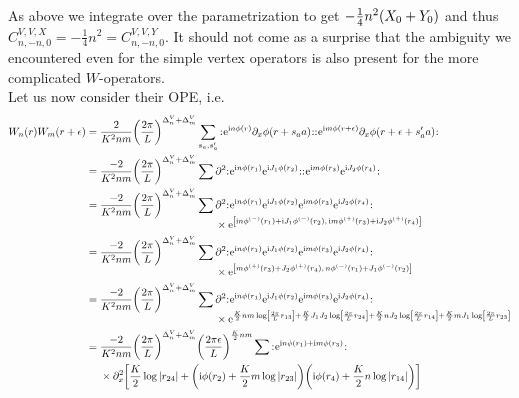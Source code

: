 \documentclass[english, parskip=full]{scrartcl}
\begin{document}
As above we integrate over the parametrization to get $- \frac{1}{4}n^2 \kla*{X_0 + Y_0}$ and thus $C^{V,V,X}_{n,-n,0} = -\frac{1}{4} n^2 = C^{V,V,Y}_{n,-n,0}$.
It should not come as a surprise that the ambiguity we encountered even for the simple vertex operators is also present for the more complicated $W$-operators.\\
Let us now consider their OPE, i.e.
\begin{align}
W_n(r) W_m(r+\epsilon) &= \frac{2}{K^2nm} \kla*{\frac{2\pi}{L}}^{\Delta^V_n + \Delta^V_m} \sum_{s_a,s_a'} \normord{\powe{\i n\phi(r)} \partial_x\phi(r+s_aa)} \normord{\powe{\i m\phi(r+\epsilon)} \partial_x\phi(r+\epsilon+s_a'a)}\\
&= \frac{-2}{K^2nm} \kla*{\frac{2\pi}{L}}^{\Delta^V_n + \Delta^V_m} \sum \partial^2 \normord{\powe{\i n\phi(r_1)} \powe{\i J_1\phi(r_2)}} \normord{\powe{\i m\phi(r_3)} \powe{\i J_2\phi(r_4)}}\\
&= \frac{-2}{K^2nm} \kla*{\frac{2\pi}{L}}^{\Delta^V_n + \Delta^V_m} \sum \bsplit{&\partial^2 \normord{\powe{\i n\phi(r_1)} \powe{\i J_1\phi(r_2)} \powe{\i m\phi(r_3)} \powe{\i J_2\phi(r_4)}} \\
&\times \powe{\klb*{\i n\phi^{(-)}(r_1) + \i J_1 \phi^{(-)}(r_2),\, \i m\phi^{(+)}(r_3) + \i J_2 \phi^{(+)}(r_4)}}}\\
&= \frac{-2}{K^2nm} \kla*{\frac{2\pi}{L}}^{\Delta^V_n + \Delta^V_m} \sum \bsplit{&\partial^2 \normord{\powe{\i n\phi(r_1)} \powe{\i J_1\phi(r_2)} \powe{\i m\phi(r_3)} \powe{\i J_2\phi(r_4)}} \\
&\times \powe{\klb*{m\phi^{(+)}(r_3) + J_2 \phi^{(+)}(r_4),\, n\phi^{(-)}(r_1) + J_1 \phi^{(-)}(r_2)}}}\\
&= \frac{-2}{K^2nm} \kla*{\frac{2\pi}{L}}^{\Delta^V_n + \Delta^V_m} \sum \bsplit{&\partial^2 \normord{\powe{\i n\phi(r_1)} \powe{\i J_1\phi(r_2)} \powe{\i m\phi(r_3)} \powe{\i J_2\phi(r_4)}} \\
&\times \powe{\frac{K}{2} nm \log \klb*{\frac{2\pi}{L} r_{13}} + \frac{K}{2} J_1J_2 \log \klb*{\frac{2\pi}{L} r_{24}} + \frac{K}{2} nJ_2 \log \klb*{\frac{2\pi}{L} r_{14}} + \frac{K}{2} mJ_1 \log \klb*{\frac{2\pi}{L} r_{23}} }}\\
&= \bsplit{&\frac{-2}{K^2nm} \kla*{\frac{2\pi}{L}}^{\Delta^V_n + \Delta^V_m} \kla*{\frac{2\pi\epsilon}{L}}^{\frac{K}{2}nm} \sum \normord{\powe{\i n\phi(r_1) + \i m\phi(r_3)}} \\
&\times \partial_x^2 \klb*{\frac{K}{2} \log |r_{24}| + \kla*{\i \phi(r_2) + \frac{K}{2} m\log |r_{23}|} \kla*{\i \phi(r_4) + \frac{K}{2} n\log |r_{14}|}} }\\

\end{align}
\end{document}
